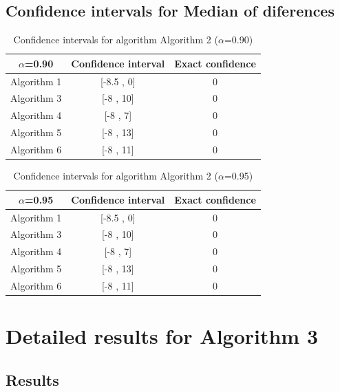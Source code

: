 \documentclass[a4paper,10pt]{article}
\begin{document}
\subsection{Confidence intervals for Median of diferences}

\begin{table}[!htp]
\centering\small
\begin{tabular}{
|c|c|c|}
\hline
 $\alpha$=0.90 & Confidence interval & Exact confidence \\ \hline 
Algorithm 1 & [-8.5 , 0] & 0\\ \hline 
Algorithm 3 & [-8 , 10] & 0\\ \hline 
Algorithm 4 & [-8 , 7] & 0\\ \hline 
Algorithm 5 & [-8 , 13] & 0\\ \hline 
Algorithm 6 & [-8 , 11] & 0\\ \hline 

\end{tabular}
\caption{Confidence intervals for algorithm Algorithm 2 ($\alpha$=0.90)}
\end{table}
\begin{table}[!htp]
\centering\small
\begin{tabular}{
|c|c|c|}
\hline
 $\alpha$=0.95 & Confidence interval & Exact confidence \\ \hline 
Algorithm 1 & [-8.5 , 0] & 0\\ \hline 
Algorithm 3 & [-8 , 10] & 0\\ \hline 
Algorithm 4 & [-8 , 7] & 0\\ \hline 
Algorithm 5 & [-8 , 13] & 0\\ \hline 
Algorithm 6 & [-8 , 11] & 0\\ \hline 

\end{tabular}
\caption{Confidence intervals for algorithm Algorithm 2 ($\alpha$=0.95)}
\end{table}

 \clearpage 


\section{Detailed results for Algorithm 3}


\subsection{Results}
\end{document}
